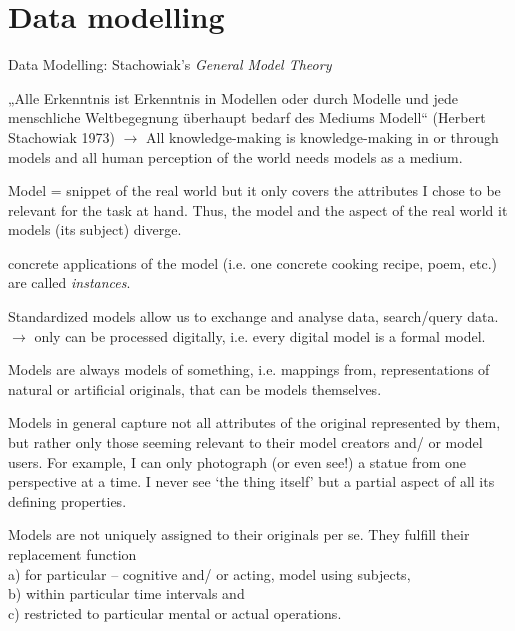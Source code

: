 

\section{Data modelling}


\begin{frame}[allowframebreaks]{Data Modelling: Stachowiak's \emph{General Model Theory}}
\small 

„Alle Erkenntnis ist Erkenntnis in Modellen oder durch Modelle und jede
menschliche Weltbegegnung überhaupt bedarf des Mediums Modell“ (Herbert Stachowiak 1973)
\alert{$\to$ All knowledge-making is knowledge-making in or through models and all human perception of the world needs models as a medium. }
\smallskip


Model = snippet of the real world but it only covers the attributes I chose to be relevant for the task at hand. 
Thus, the model and the aspect of the real world it models (its subject) diverge. 

\smallskip

concrete applications of the model (i.e. one concrete cooking recipe, poem, etc.) are called \emph{instances}.

\smallskip

Standardized models allow us to exchange and analyse data, search/query data. 
 $\to$ only  can be processed digitally, i.e. every digital model is a formal model.
\smallskip

\framebreak\small

 {Models are always models of something, i.e. mappings from, representations of natural or artificial originals, that can be models themselves.}
\smallskip

Models in general capture not all attributes of the original represented by them, but rather only those seeming relevant to their model creators and/ or model users. For example, I can only photograph (or even see!) a statue from one perspective at a time. I never see `the thing itself' but a partial aspect of all its defining properties. 

\smallskip

 Models are not uniquely assigned to their originals per se. They fulfill their replacement function \\
 \footnotesize
    a) for particular – cognitive and/ or acting, model using subjects, \\
    b) within particular time intervals and \\
    c) restricted to particular mental or actual operations.

\smallskip



\end{frame}

